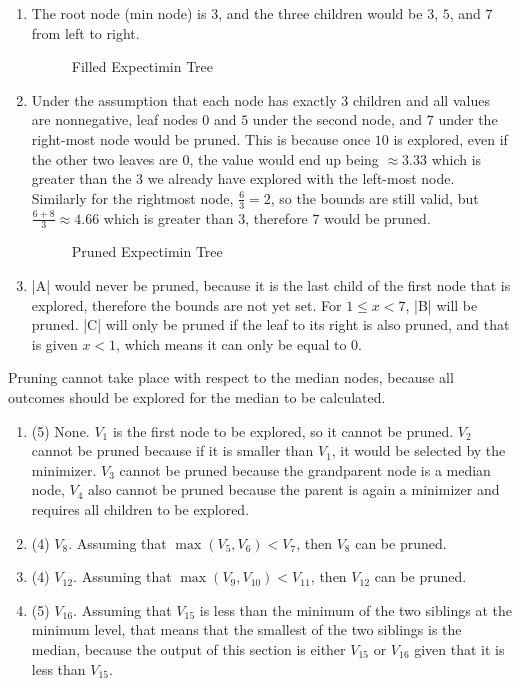 \documentclass{homework}
\begin{document}
\exercise[5]
\begin{enumerate}
    \item The root node (min node) is $3$, and the three children would be $3$, $5$, and $7$ from left to right.
    \begin{figure}[h!]
        \centering
        
        \caption{Filled Expectimin Tree}
        \label{fig:q51}
    \end{figure}

    \item Under the assumption that each node has exactly $3$ children and all values are nonnegative, leaf nodes $0$ and $5$ under the second node, and $7$ under the right-most node would be pruned. This is because once $10$ is explored, even if the other two leaves are $0$, the value would end up being $\approx 3.33$ which is greater than the $3$ we already have explored with the left-most node. Similarly for the rightmost node, $\frac{6}{3} = 2$, so the bounds are still valid, but $\frac{6 + 8}{3} \approx 4.66$ which is greater than $3$, therefore $7$ would be pruned.
    \begin{figure}[h!]
        \centering
        
        \caption{Pruned Expectimin Tree}
        \label{fig:q52}
    \end{figure}
    
    \item \cverb|A| would never be pruned, because it is the last child of the first node that is explored, therefore the bounds are not yet set. For $1 \leq x < 7$, \cverb|B| will be pruned. \cverb|C| will only be pruned if the leaf to its right is also pruned, and that is given $x < 1$, which means it can only be equal to $0$.
    
\end{enumerate}

\clearpage
\exercise[6]
Pruning cannot take place with respect to the median nodes, because all outcomes should be explored for the median to be calculated.
\begin{enumerate}
    \item (5) None. $V_1$ is the first node to be explored, so it cannot be pruned. $V_2$ cannot be pruned because if it is smaller than $V_1$, it would be selected by the minimizer. $V_3$ cannot be pruned because the grandparent node is a median node, $V_4$ also cannot be pruned because the parent is again a minimizer and requires all children to be explored.
    
    \item (4) $V_8$. Assuming that $\max(V_5, V_6) < V_7$, then $V_8$ can be pruned.
    
    \item (4) $V_{12}$. Assuming that $\max(V_{9}, V_{10}) < V_{11}$, then $V_{12}$ can be pruned.
    
    \item (5) $V_{16}$. Assuming that $V_{15}$ is less than the minimum of the two siblings at the minimum level, that means that the smallest of the two siblings is the median, because the output of this section is either $V_{15}$ or $V_{16}$ given that it is less than $V_{15}$.
\end{enumerate}
\end{document}
